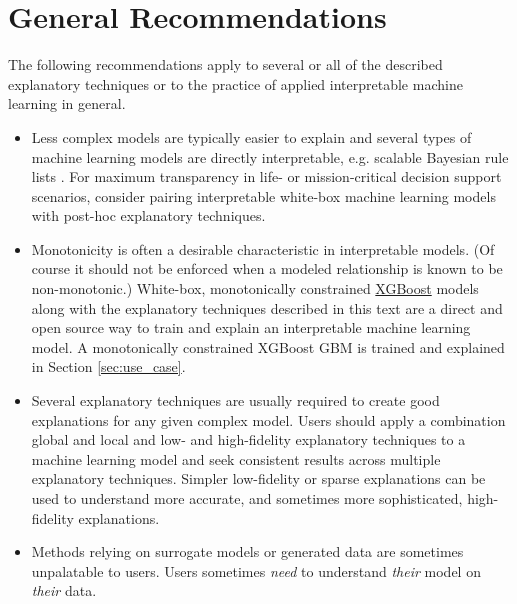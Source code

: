 \documentclass[sigconf, review]{acmart}
\begin{document}
\section{General Recommendations} \label{sec:gen_rec}

The following recommendations apply to several or all of the described explanatory techniques or to the practice of applied interpretable machine learning in general.

\begin{itemize}	
	
	\item Less complex models are typically easier to explain and several types of machine learning models are directly interpretable, e.g. scalable Bayesian rule lists \cite{sbrl}. For maximum transparency in life- or mission-critical decision support scenarios, consider pairing interpretable white-box machine learning models with post-hoc explanatory techniques.\\
	
	\item Monotonicity is often a desirable characteristic in interpretable models. (Of course it should not be enforced when a modeled relationship is known to be non-monotonic.) White-box, monotonically constrained \href{https://github.com/dmlc/xgboost}{XGBoost} models along with the explanatory techniques described in this text are a direct and open source way to train and explain an interpretable machine learning model. A monotonically constrained XGBoost GBM is trained and explained in Section \ref{sec:use_case}.\\
	
	\item Several explanatory techniques are usually required to create good explanations for any given complex model. Users should apply a combination global and local and low- and high-fidelity explanatory techniques to a machine learning model and seek consistent results across multiple explanatory techniques. Simpler low-fidelity or sparse explanations can be used to understand more accurate, and sometimes more sophisticated, high-fidelity explanations. \\ 

	\item Methods relying on surrogate models or generated data are sometimes unpalatable to users. Users sometimes \textit{need} to understand \textit{their} model on \textit{their} data.\\
	

\end{itemize}
\end{document}
